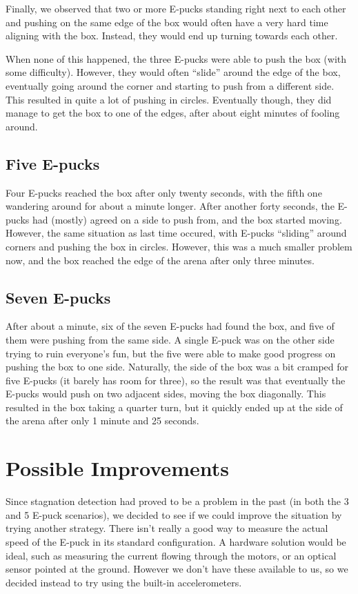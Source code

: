 \documentclass[a4paper,12pt]{article}
\begin{document}
Finally, we observed that two or more E-pucks standing right next to each other and pushing on the same edge of the box would often have a very hard time aligning with the box. Instead, they would end up turning towards each other.

When none of this happened, the three E-pucks were able to push the box (with some difficulty). However, they would often ``slide'' around the edge of the box, eventually going around the corner and starting to push from a different side. This resulted in quite a lot of pushing in circles. Eventually though, they did manage to get the box to one of the edges, after about eight minutes of fooling around.

\subsection{Five E-pucks}
Four E-pucks reached the box after only twenty seconds, with the fifth one wandering around for about a minute longer. After another forty seconds, the E-pucks had (mostly) agreed on a side to push from, and the box started moving. However, the same situation as last time occured, with E-pucks ``sliding'' around corners and pushing the box in circles. However, this was a much smaller problem now, and the box reached the edge of the arena after only three minutes. 

\subsection{Seven E-pucks}
After about a minute, six of the seven E-pucks had found the box, and five of them were pushing from the same side. A single E-puck was on the other side trying to ruin everyone's fun, but the five were able to make good progress on pushing the box to one side. Naturally, the side of the box was a bit cramped for five E-pucks (it barely has room for three), so the result was that eventually the E-pucks would push on two adjacent sides, moving the box diagonally. This resulted in the box taking a quarter turn, but it quickly ended up at the side of the arena after only 1 minute and 25 seconds.

\section{Possible Improvements}
Since stagnation detection had proved to be a problem in the past (in both the 3 and 5 E-puck scenarios), we decided to see if we could improve the situation by trying another strategy. There isn't really a good way to measure the actual speed of the E-puck in its standard configuration. A hardware solution would be ideal, such as measuring the current flowing through the motors, or an optical sensor pointed at the ground. However we don't have these available to us, so we decided instead to try using the built-in accelerometers.
\end{document}

